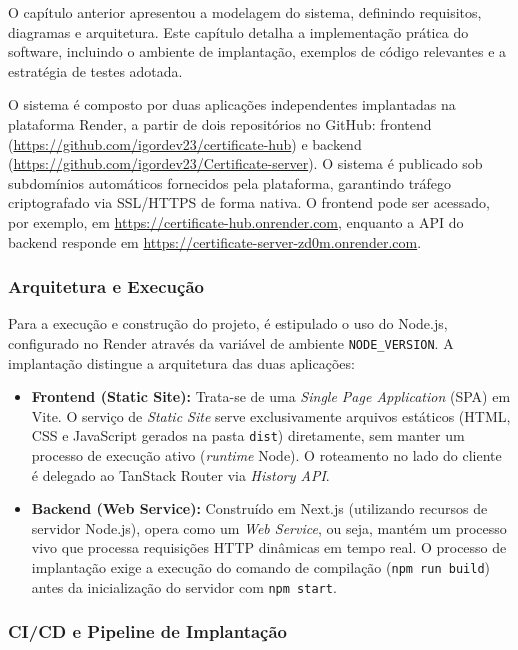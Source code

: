 ﻿

O capítulo anterior apresentou a modelagem do sistema, definindo requisitos, diagramas e arquitetura. Este capítulo detalha a implementação prática do software, incluindo o ambiente de implantação, exemplos de código relevantes e a estratégia de testes adotada.



O sistema é composto por duas aplicações independentes implantadas na plataforma Render, a partir de dois repositórios no GitHub: frontend (\url{https://github.com/igordev23/certificate-hub}) e backend (\url{https://github.com/igordev23/Certificate-server}). O sistema é publicado sob subdomínios automáticos fornecidos pela plataforma, garantindo tráfego criptografado via SSL/HTTPS de forma nativa. O frontend pode ser acessado, por exemplo, em \url{https://certificate-hub.onrender.com}, enquanto a API do backend responde em \url{https://certificate-server-zd0m.onrender.com}.

\subsubsection{Arquitetura e Execução}

Para a execução e construção do projeto, é estipulado o uso do Node.js, configurado no Render através da variável de ambiente \texttt{NODE\_VERSION}. A implantação distingue a arquitetura das duas aplicações:

\begin{itemize}
    \item \textbf{Frontend (Static Site):} Trata-se de uma \textit{Single Page Application} (SPA) em Vite. O serviço de \textit{Static Site} serve exclusivamente arquivos estáticos (HTML, CSS e JavaScript gerados na pasta \texttt{dist}) diretamente, sem manter um processo de execução ativo (\textit{runtime} Node). O roteamento no lado do cliente é delegado ao TanStack Router via \textit{History API}.
    \item \textbf{Backend (Web Service):} Construído em Next.js (utilizando recursos de servidor Node.js), opera como um \textit{Web Service}, ou seja, mantém um processo vivo que processa requisições HTTP dinâmicas em tempo real. O processo de implantação exige a execução do comando de compilação (\texttt{npm run build}) antes da inicialização do servidor com \texttt{npm start}.
\end{itemize}

\subsubsection{CI/CD e Pipeline de Implantação}

